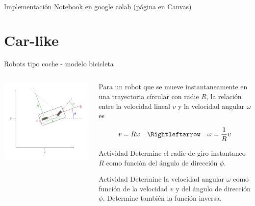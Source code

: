 \documentclass[presentation,aspectratio=169]{beamer}
\begin{document}
\begin{frame}[label={sec:org69b2c3d}]{Implementación}
Notebook en google colab (página en Canvas)
\end{frame}


\section{Car-like}
\label{sec:org687bd93}

\begin{frame}[label={sec:orge8c3f3b}]{Robots tipo coche - modelo bicicleta}
\begin{columns}
\begin{column}{0.4\columnwidth}
\begin{center}
 \includegraphics[width=1.05\linewidth]{../figures/bicycle-model}
\end{center}
\end{column}

\begin{column}{0.6\columnwidth}
\pause

Para un robot que se mueve instantaneamente en una trayectoria círcular con radie \(R\), la relación entre la velocidad lineal \(v\) y la velocidad angular \(\omega\) es

\pause

\[ v = R\omega \quad \Rightleftarrow \quad \omega = \frac{1}{R} v \]

\pause
\alert{Actividad} Determine el radie de giro instantaneo \(R\) como función del ángulo de dirección \(\phi\).

\pause
\alert{Actividad} Determine la velocidad angular \(\omega\) como función de la velocidad \(v\) y del ángulo de dirección \(\phi\). Determine también la función inversa.
\end{column}
\end{columns}
\end{frame}
\end{document}
